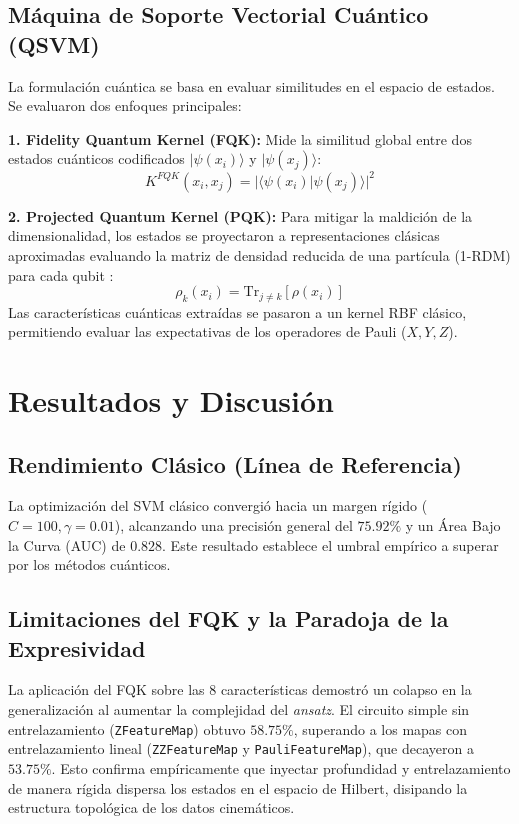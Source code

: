 \documentclass[11pt,a4paper]{article}
\begin{document}
\subsection{Máquina de Soporte Vectorial Cuántico (QSVM)}
La formulación cuántica se basa en evaluar similitudes en el espacio de estados. Se evaluaron dos enfoques principales:

\textbf{1. Fidelity Quantum Kernel (FQK):} Mide la similitud global entre dos estados cuánticos codificados $|\psi(x_i)\rangle$ y $|\psi(x_j)\rangle$:
\begin{equation}
    K^{FQK}(x_i, x_j) = |\langle \psi(x_i) | \psi(x_j) \rangle|^2
\end{equation}

\textbf{2. Projected Quantum Kernel (PQK):} Para mitigar la maldición de la dimensionalidad, los estados se proyectaron a representaciones clásicas aproximadas evaluando la matriz de densidad reducida de una partícula (1-RDM) para cada qubit \cite{huang2021}:
\begin{equation}
    \rho_k(x_i) = \text{Tr}_{j \neq k}[\rho(x_i)]
\end{equation}
Las características cuánticas extraídas se pasaron a un kernel RBF clásico, permitiendo evaluar las expectativas de los operadores de Pauli ($X, Y, Z$).

\section{Resultados y Discusión}

\subsection{Rendimiento Clásico (Línea de Referencia)}
La optimización del SVM clásico convergió hacia un margen rígido ($C=100, \gamma=0.01$), alcanzando una precisión general del $75.92\%$ y un Área Bajo la Curva (AUC) de $0.828$. Este resultado establece el umbral empírico a superar por los métodos cuánticos.

\subsection{Limitaciones del FQK y la Paradoja de la Expresividad}
La aplicación del FQK sobre las 8 características demostró un colapso en la generalización al aumentar la complejidad del \textit{ansatz}. El circuito simple sin entrelazamiento (\texttt{ZFeatureMap}) obtuvo $58.75\%$, superando a los mapas con entrelazamiento lineal (\texttt{ZZFeatureMap} y \texttt{PauliFeatureMap}), que decayeron a $53.75\%$. Esto confirma empíricamente que inyectar profundidad y entrelazamiento de manera rígida dispersa los estados en el espacio de Hilbert, disipando la estructura topológica de los datos cinemáticos.
\end{document}
